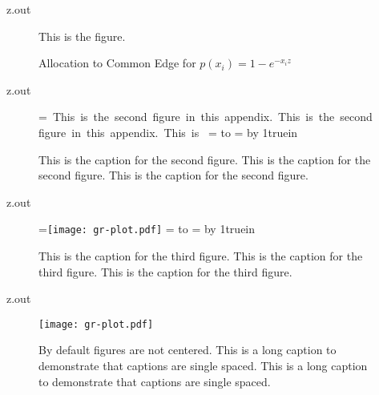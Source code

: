 \MyIO


\begin{VerbatimOut}{z.out}

\begin{figure}
  This is the figure.
  \caption{%
    Allocation to Common Edge for
    \(p(x_i) = 1-e^{-x_iz}\)%
  }
\end{figure}
\end{VerbatimOut}

\MyIO


\begin{VerbatimOut}{z.out}

\begin{sidewaysfigure}[ht]
  =\hbox{%
    \noindent
    This is the second figure in this appendix.
    This is the second figure in this appendix.
    This is%
  }
  =
  \hbox to \textwidth{\hss\box0\hss}
  \textwidth=
  \advance\textwidth by 1truein
  \caption{%
    This is the caption for the second figure.
    This is the caption for the second figure.
    This is the caption for the second figure.%
  }
\end{sidewaysfigure}
\end{VerbatimOut}

\MyIO


\begin{VerbatimOut}{z.out}

\begin{sidewaysfigure}[ht]
  =\hbox{\noindent \texttt{[image: gr-plot.pdf]}}
  =
  \hbox to \textwidth{\hss\box0\hss}
  \textwidth=
  \advance\textwidth by 1truein
  \caption{
    This is the caption for the third figure.
    This is the caption for the third figure.
    This is the caption for the third figure.%
  }
\end{sidewaysfigure}
\end{VerbatimOut}

\MyIO


\begin{VerbatimOut}{z.out}

\begin{figure}[ht]
  \texttt{[image: gr-plot.pdf]}
  \caption
  {%
    By default figures are not centered.
    This is a long caption to demonstrate that captions are single spaced.
    This is a long caption to demonstrate that captions are single spaced.%
  }
  \label{fi:not-centered}
\end{figure}
\end{VerbatimOut}

